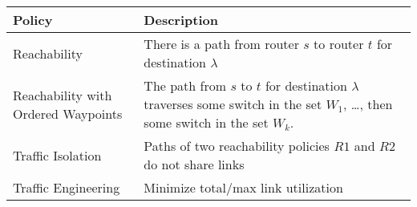 \begin{table}[!t]
\begin{small}
	\begin{center}
		\begin{tabular}{m{7.8em}  m{15.9em} } 
			{\bf Policy} & {\bf Description} \\ 
			\hline
			Reachability & There is a path from router $s$ to router $t$ for destination $\lambda$ \\ \hline
			Reachability with \newline Ordered Waypoints & The path  from $s$ to $t$ for destination $\lambda$ 
			traverses some switch in the set $W_1$, \ldots, then some switch in the set $W_k$.\\ \hline
			Traffic Isolation & Paths of two reachability policies $R1$ and $R2$ do not share  links \\ \hline
			Traffic Engineering  & Minimize total/max link utilization \\
		\end{tabular}
	\end{center}
	 \label{tab:policysupport} 
\end{small}
\end{table}

